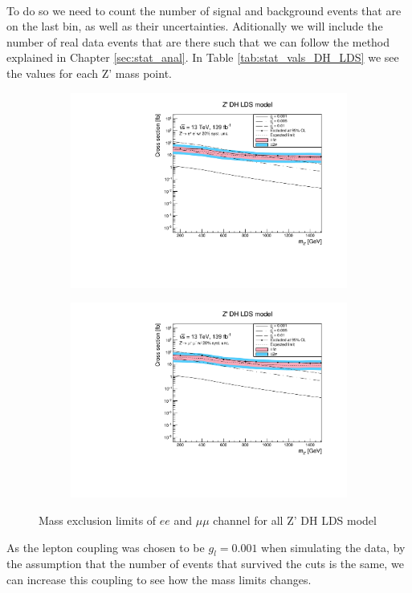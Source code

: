 \documentclass[14pt, a4paper]{book}
\begin{document}
\\To do so we need to count the number of signal and background events that are on the last bin, as well as their uncertainties. Aditionally we will include the number of real data events that are there such that we can follow the 
method explained in Chapter \ref{sec:stat_anal}. In Table \ref{tab:stat_vals_DH_LDS} we see the values for each Z' mass point.
\begin{figure}[!ht]
	\centering
   \begin{subfigure}[b]{0.49\textwidth}
      \centering
      \includegraphics[width=1\textwidth]{Limits/DH_LDS/mass_exclusion_ee.pdf}
      \end{subfigure}
   \hfill
   \begin{subfigure}[b]{0.49\textwidth}
      \centering
      \includegraphics[width=1\textwidth]{Limits/DH_LDS/mass_exclusion_uu.pdf}
      \end{subfigure}
   \caption{Mass exclusion limits of $ee$ and $\mu\mu$ channel for all Z' DH LDS model}\label{fig:DH_LDS_exclusion_ee_uu}
\end{figure}
As the lepton coupling was chosen to be $g_l=0.001$ when simulating the data, by the assumption that the number of events that survived the cuts is the same, we can increase this coupling to see how the mass limits changes.
\end{document}
